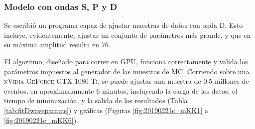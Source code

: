 


\subsubsection{Modelo con ondas S, P y D}

Se escribió
un programa capaz de ajustar muestras de datos con onda D. Esto incluye, evidentemente, ajustar un conjunto de parámetros más grande, y que en su máxima amplitud resulta en 76.

El algoritmo, diseñado para correr en GPU, funciona correctamente y valida los parámetros impuestos al generador de las muestras de MC. Corriendo sobre una \textsc{nVidia GeForce GTX 1080 Ti}, se puede ajustar una muestra de $0.5$ millones de eventos, en aproximadamente $6$ minutos, incluyendo la carga de los datos, el tiempo de minimización, y la salida de los resultados (Tabla \ref{tab:fitDwaveparams}) y gráficas (Figuras \ref{fig:20190221c_mKK1} a \ref{fig:20190221c_mKK6}).











